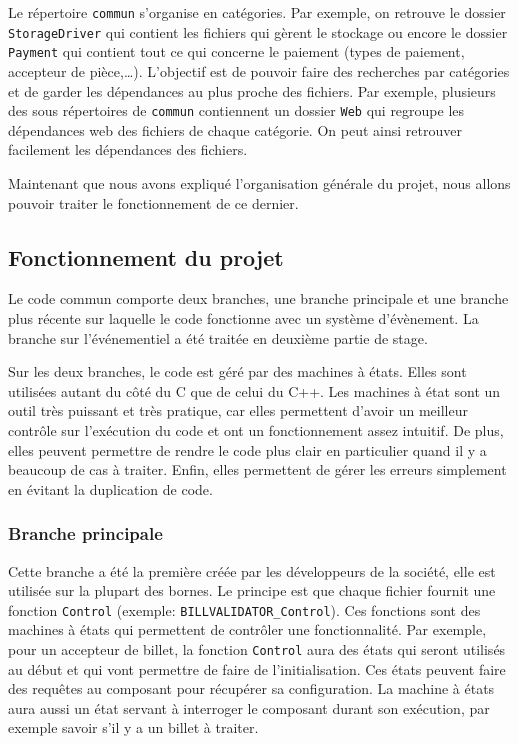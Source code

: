 \documentclass[a4paper]{article}
\begin{document}
Le répertoire \verb|commun| s'organise en catégories. Par exemple, on retrouve
le dossier \verb|StorageDriver| qui contient les fichiers qui gèrent le stockage
ou encore le dossier \verb|Payment| qui contient tout ce qui concerne le
paiement (types de paiement, accepteur de pièce,\dots). L'objectif est de
pouvoir faire des recherches par catégories et de garder les dépendances au plus
proche des fichiers. Par exemple, plusieurs des sous répertoires de
\verb|commun| contiennent un dossier \verb|Web| qui regroupe les dépendances web
des fichiers de chaque catégorie. On peut ainsi retrouver facilement les
dépendances des fichiers.

Maintenant que nous avons expliqué l'organisation générale du projet, nous
allons pouvoir traiter le fonctionnement de ce dernier.

\subsection{Fonctionnement du projet}

Le code commun comporte deux branches, une branche principale et une branche
plus récente sur laquelle le code fonctionne avec un système d'évènement. La
branche sur l'événementiel a été traitée en deuxième partie de stage.

Sur les deux branches, le code est géré par des machines à états. Elles sont
utilisées autant du côté du C que de celui du C++. Les machines à état sont un
outil très puissant et très pratique, car elles permettent d'avoir un meilleur
contrôle sur l'exécution du code et ont un fonctionnement assez intuitif. De
plus, elles peuvent permettre de rendre le code plus clair en particulier quand
il y a beaucoup de cas à traiter. Enfin, elles permettent de gérer les erreurs
simplement en évitant la duplication de code.

\subsubsection{Branche principale}

Cette branche a été la première créée par les développeurs de la société, elle
est utilisée sur la plupart des bornes. Le principe est que chaque fichier
fournit une fonction \verb|Control| (exemple: \verb|BILLVALIDATOR_Control|). Ces
fonctions sont des machines à états qui permettent de contrôler une
fonctionnalité. Par exemple, pour un accepteur de billet, la fonction
\verb|Control| aura des états qui seront utilisés au début et qui vont permettre
de faire de l'initialisation. Ces états peuvent faire des requêtes au composant
pour récupérer sa configuration. La machine à états aura aussi un état servant à
interroger le composant durant son exécution, par exemple savoir s'il y a
un billet à traiter.
\end{document}
